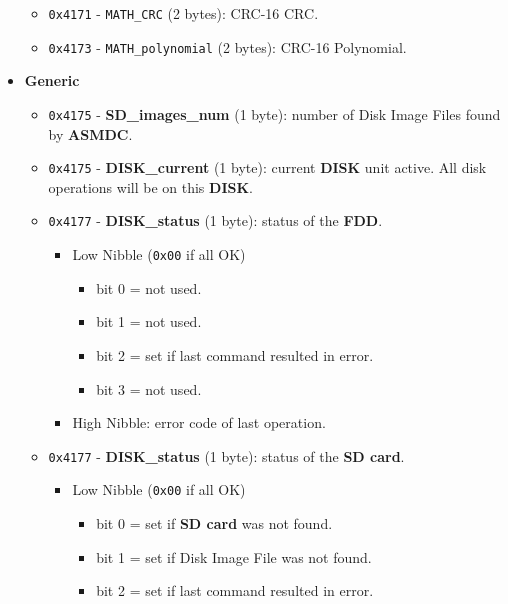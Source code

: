 \begin{itemize}
\begin{itemize}
                \item \texttt{0x4171} - \texttt{MATH\_CRC} (2 bytes): CRC-16 CRC.
                \item \texttt{0x4173} - \texttt{MATH\_polynomial} (2 bytes): CRC-16
                Polynomial.
            \end{itemize}
            \item \textbf{Generic}
            \begin{itemize}
                \item \texttt{0x4175} - \textbf{SD\_images\_num} (1 byte): number
                of Disk Image Files found by \textbf{ASMDC}.
                \item \texttt{0x4175} - \textbf{DISK\_current} (1 byte): current 
                \textbf{DISK} unit active. All disk operations will be on this
                \textbf{DISK}.
                \item \texttt{0x4177} - \textbf{DISK\_status} (1 byte): status of
                the \textbf{FDD}.
                \begin{itemize}
                    \item Low Nibble (\texttt{0x00} if all OK)
                    \begin{itemize}
                        \item bit 0 = not used.
                        \item bit 1 = not used.
                        \item bit 2 = set if last command resulted in error.
                        \item bit 3 = not used.
                    \end{itemize}
                    \item High Nibble: error code of last operation.
                \end{itemize}
                \item \texttt{0x4177} - \textbf{DISK\_status} (1 byte): status of
                the \textbf{SD card}.
                \begin{itemize}
                    \item Low Nibble (\texttt{0x00} if all OK)
                    \begin{itemize}
                        \item bit 0 = set if \textbf{SD card} was not found.
                        \item bit 1 = set if Disk Image File was not found.
                        \item bit 2 = set if last command resulted in error.

\end{itemize}
\end{itemize}
\end{itemize}
\end{itemize}
